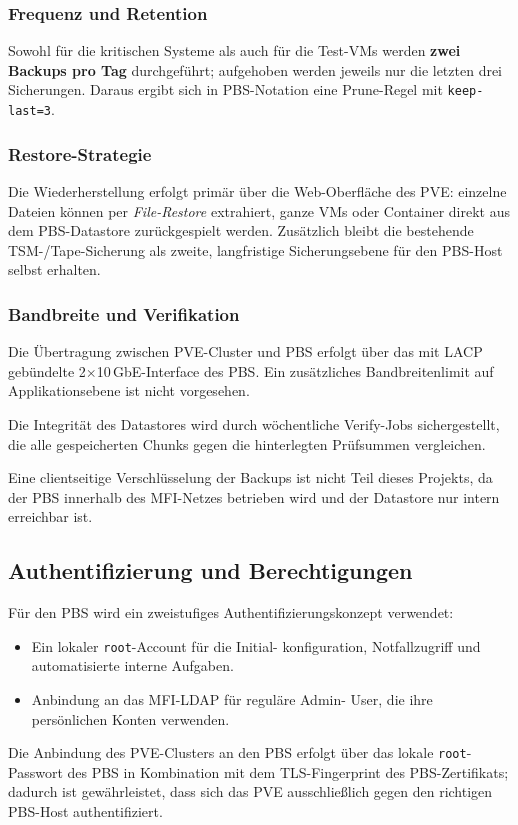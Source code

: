 \subsubsection*{Frequenz und Retention}
Sowohl für die kritischen Systeme als auch für die Test-\acp{VM}
werden \textbf{zwei Backups pro Tag} durchgeführt; aufgehoben
werden jeweils nur die letzten drei Sicherungen.
Daraus ergibt sich in \ac{PBS}-Notation eine Prune-Regel mit
\texttt{keep-last=3}.

\subsubsection*{Restore-Strategie}
Die Wiederherstellung erfolgt primär über die Web-Oberfläche des
\ac{PVE}: einzelne Dateien können per \emph{File-Restore} extrahiert,
ganze \acp{VM} oder Container direkt aus dem \ac{PBS}-Datastore
zurückgespielt werden. Zusätzlich bleibt die bestehende
\ac{TSM}-/Tape-Sicherung als zweite, langfristige Sicherungsebene
für den \ac{PBS}-Host selbst erhalten.

\subsubsection*{Bandbreite und Verifikation}
Die Übertragung zwischen \ac{PVE}-Cluster und \ac{PBS} erfolgt über
das mit \ac{LACP} gebündelte 2$\times$10\,GbE-Interface des \ac{PBS}.
Ein zusätzliches Bandbreitenlimit auf Applikationsebene ist nicht
vorgesehen.

Die Integrität des Datastores wird durch wöchentliche Verify-Jobs
sichergestellt, die alle gespeicherten Chunks gegen die hinterlegten
Prüfsummen vergleichen.

Eine clientseitige Verschlüsselung der Backups ist nicht Teil dieses
Projekts, da der \ac{PBS} innerhalb des \ac{MFI}-Netzes betrieben
wird und der Datastore nur intern erreichbar ist.


\subsection{Authentifizierung und Berechtigungen}
\label{sec:AuthZ}
Für den \ac{PBS} wird ein zweistufiges Authentifizierungskonzept
verwendet:
\begin{itemize}
    \item Ein lokaler \texttt{root}-Account für die Initial-
          konfiguration, Notfallzugriff und automatisierte interne
          Aufgaben.
    \item Anbindung an das \ac{MFI}-\ac{LDAP} für reguläre Admin-
          User, die ihre persönlichen Konten verwenden.
\end{itemize}
Die Anbindung des \ac{PVE}-Clusters an den \ac{PBS} erfolgt über das
lokale \texttt{root}-Passwort des \ac{PBS} in Kombination mit dem
TLS-Fingerprint des \ac{PBS}-Zertifikats; dadurch ist gewährleistet,
dass sich das \ac{PVE} ausschließlich gegen den richtigen
\ac{PBS}-Host authentifiziert.


